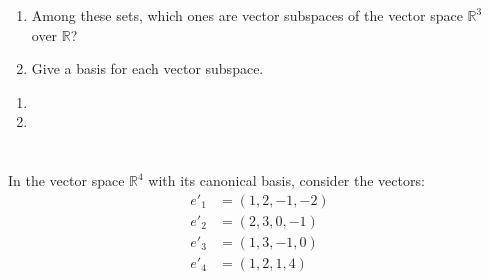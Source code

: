 \documentclass[12pt]{article}
\begin{document}
\begin{enumerate}
    \item Among these sets, which ones are vector subspaces of the vector space $\mathbb{R}^3$ over $\mathbb{R}$?
    \item Give a basis for each vector subspace.
\end{enumerate}
                                                                                                                                                                                                                                         
\begin{correctionbox}                                                                                                                                                                                                                    
 \begin{enumerate}                                                                                                 
     \item 
     \item 
 \end{enumerate}                                                                                                   
\end{correctionbox}                                                                                                                                                                                                                      
                                                                                                                                                                                                                                         
\section{}                                                                                                                                                                                                                               
In the vector space $\mathbb{R}^4$ with its canonical basis, consider the vectors:
\begin{align*}
e'_1 &= (1, 2, -1, -2)\\
e'_2 &= (2, 3, 0, -1)\\
e'_3 &= (1, 3, -1, 0)\\
e'_4 &= (1, 2, 1, 4)
\end{align*}
\end{document}
